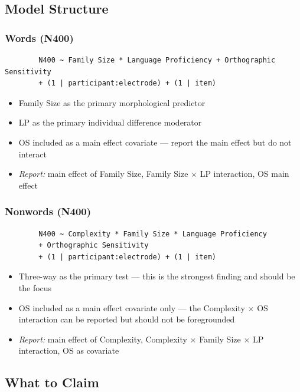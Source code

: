 \documentclass[12pt]{article}
\begin{document}
	\subsection{Model Structure}
	
	\subsubsection{Words (N400)}
	
	\begin{verbatim}
		N400 ~ Family Size * Language Proficiency + Orthographic Sensitivity
		+ (1 | participant:electrode) + (1 | item)
	\end{verbatim}
	
	\begin{itemize}
		\item Family Size as the primary morphological predictor
		\item LP as the primary individual difference moderator
		\item OS included as a main effect covariate --- report the main effect but do not interact
		\item \textit{Report:} main effect of Family Size, Family Size $\times$ LP interaction, OS main effect
	\end{itemize}
	
	\subsubsection{Nonwords (N400)}
	
	\begin{verbatim}
		N400 ~ Complexity * Family Size * Language Proficiency
		+ Orthographic Sensitivity
		+ (1 | participant:electrode) + (1 | item)
	\end{verbatim}
	
	\begin{itemize}
		\item Three-way as the primary test --- this is the strongest finding and should be the focus
		\item OS included as a main effect covariate only --- the Complexity $\times$ OS interaction can be reported but should not be foregrounded
		\item \textit{Report:} main effect of Complexity, Complexity $\times$ Family Size $\times$ LP interaction, OS as covariate
	\end{itemize}
	
	\subsection{What to Claim}
	
\end{document}
